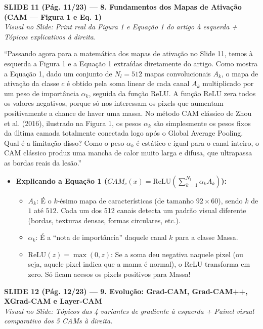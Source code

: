 \documentclass[11pt,a4paper]{article}
\newcommand{\slideheader}[3]{%
    \vspace{10pt}%
    \begin{tcolorbox}[colback=slateborder, colframe=slateborder, coltext=white, boxrule=0pt, arc=3pt, left=8pt, right=8pt, top=5pt, bottom=5pt]
        {\large\bfseries #1 — #2}\\[2pt]
        {\small\itshape Visual no Slide: #3}
    \end{tcolorbox}%
}
\newenvironment{falabox}{%
    \begin{tcolorbox}[colback=speechbg, colframe=speechborder, boxrule=1.2pt, arc=4pt, left=10pt, right=10pt, top=8pt, bottom=8pt, title={\bfseries O QUE VOCÊ DEVE FALAR (Fala Sugerida)}]%
}{%
    \end{tcolorbox}%
}
\newenvironment{explicabox}{%
    \begin{tcolorbox}[colback=explainbg, colframe=explainborder, boxrule=0.8pt, arc=4pt, left=10pt, right=10pt, top=8pt, bottom=8pt, title={\bfseries ENTENDA O QUE VOCÊ ESTÁ FALANDO (Explicação Didática de Cada Termo)}]%
}{%
    \end{tcolorbox}%
}
\begin{document}
\newpage
\slideheader{SLIDE 11 (Pág. 11/23)}{8. Fundamentos dos Mapas de Ativação (CAM — Figura 1 e Eq. 1)}{Print real da Figura 1 e Equação 1 do artigo à esquerda + Tópicos explicativos à direita.}

\begin{falabox}
``Passando agora para a matemática dos mapas de ativação no Slide 11, temos à esquerda a Figura 1 e a Equação 1 extraídas diretamente do artigo. Como mostra a Equação 1, dado um conjunto de $N_l = 512$ mapas convolucionais $A_k$, o mapa de ativação da classe $c$ é obtido pela soma linear de cada canal $A_k$ multiplicado por um peso de importância $\alpha_k$, seguida da função ReLU. A função ReLU zera todos os valores negativos, porque só nos interessam os pixels que aumentam positivamente a chance de haver uma massa. No método CAM clássico de Zhou et al. (2016), ilustrado na Figura 1, os pesos $\alpha_k$ são simplesmente os pesos fixos da última camada totalmente conectada logo após o Global Average Pooling. Qual é a limitação disso? Como o peso $\alpha_k$ é estático e igual para o canal inteiro, o CAM clássico produz uma mancha de calor muito larga e difusa, que ultrapassa as bordas reais da lesão.''
\end{falabox}

\begin{explicabox}
\begin{itemize}[leftmargin=*, itemsep=4pt]
    \item \textbf{Explicando a Equação 1 ($CAM_c(x) = \text{ReLU}(\sum_{k=1}^{N_l} \alpha_k A_k)$):}
    \begin{itemize}
        \item $A_k$: É o $k$-ésimo mapa de características (de tamanho $92 \times 60$), sendo $k$ de $1$ até $512$. Cada um dos 512 canais detecta um padrão visual diferente (bordas, texturas densas, formas circulares, etc.).
        \item $\alpha_k$: É a ``nota de importância'' daquele canal $k$ para a classe Massa.
        \item $\text{ReLU}(z) = \max(0, z)$: Se a soma deu negativa naquele pixel (ou seja, aquele pixel indica que a mama é normal), o ReLU transforma em zero. Só ficam acesos os pixels positivos para Massa!
    \end{itemize}
\end{itemize}
\end{explicabox}

\newpage
\slideheader{SLIDE 12 (Pág. 12/23)}{9. Evolução: Grad-CAM, Grad-CAM++, XGrad-CAM e Layer-CAM}{Tópicos das 4 variantes de gradiente à esquerda + Painel visual comparativo dos 5 CAMs à direita.}
\end{document}

